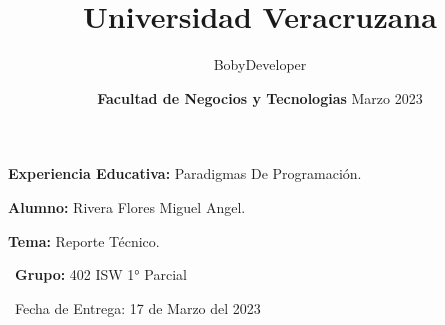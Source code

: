 \documentclass{article}
\title{\textbf{Universidad Veracruzana} }
\date{\textbf{Facultad de Negocios y Tecnologias} }
\begin{document}
\maketitle
\textsf{\Large \textbf{Experiencia Educativa:} Paradigmas De Programación.\\}
 
\maketitle
\textsf{\Large \textbf{Alumno:} Rivera Flores Miguel Angel. \\}

\maketitle
\textsf{\Large \textbf{Tema:} Reporte Técnico. \\}

\textsf{\ \textbf{Grupo:} 402 ISW 1° Parcial \\}

\maketitle

\textsf{\ Fecha de Entrega: 17 de Marzo del 2023 \\}

\author{BobyDeveloper}
\date{Marzo 2023}

\newpage
\end{document}
